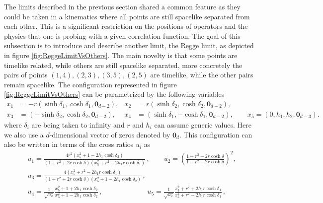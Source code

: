 The limits described in the previous section shared a common feature as they could be taken in a kinematics where all points are still spacelike separated from each other. This is a significant restriction on the positions of   operators and the physics that one is probing with a given correlation function. The goal of this subsection is to introduce and describe   another limit, the Regge limit,   as depicted in figure \ref{fig:ReggeLimitVsOthers}. The main novelty is that some points are timelike related, while others are still spacelike separated, more concretely the pairs of points $(1,4), (2,3),(3,5), (2,5)$ are timelike, while the other pairs remain spacelike. The configuration represented in figure    \ref{fig:ReggeLimitVsOthers} can be parametrized by the following variables
\begin{align}
  x_1 & = -r \left( \sinh  \delta_1  , \cosh   \delta_1 ,\textbf{0}_{d-2}\right), \label{eq:Reggelimitcoordinates}                                       &
  x_2 & = r \left( \sinh   \delta_2 , \cosh  \delta_2  ,\textbf{0}_{d-2}\right),                                                                           \\
  x_3 & =  \left( -\sinh   \delta_2 , \cosh  \delta_2  ,\textbf{0}_{d-2}\right),                                                                         &
  x_4 & =  \left( \sinh   \delta_1 , -\cosh  \delta_1   ,\textbf{0}_{d-2}\right),   \qquad	x_5  =  \left( 0,h_1,h_2,\textbf{0}_{d-3} \right) .  \nonumber
\end{align}
where $\delta_{i}$ are being taken to infinity and $r$ and $h_i$ can assume generic values. Here we also use a $d$-dimensional vector of zeros denoted by $\textbf{0}_{d}$. This configuration can also be written in terms of the cross ratios $u_i$ as
\begin{align}
   & u_1 = \frac{4 r^2 \left(x_5^2+1-2 h_1 \cosh\delta _2\right)}{\left(1+r^2+2 r \cosh\delta\right) \left(x_5^2+r^2-2 h_1 r \cosh \delta _1\right)}\,,
  \qquad u_2= \left(\frac{1+r^2-2 r \cosh \delta}{1+r^2+2 r \cosh\delta}\right)^2,
  \nonumber                                                                                                                                             \\
   & u_3= \frac{4 \left(x_5^2+r^2-2 h_1 r \cosh\delta _1\right)}{ \left(1+r^2+2 r \cosh\delta\right)\left(x_5^2+1-2 h_1 \cosh\delta_2\right)}\,,
  \\
   & u_4= \frac{1}{\sqrt{u_2}}\frac{x_5^2+1+2 h_1 \cosh \delta_2 }{x_5^2+1-2 h_1 \cosh\delta_2} \,,
  \qquad\qquad\qquad\ \
  u_5= \frac{1}{\sqrt{u_2}}\frac{x_5^2+r^2+ 2 h_1 r \cosh\delta _1}{x_5^2+r^2-2 h_1 r \cosh\delta _1} \,,
  \nonumber
\end{align}
